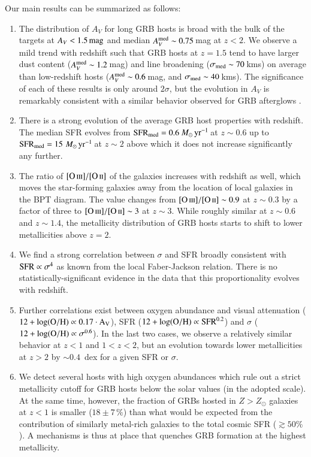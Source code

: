 \documentclass[traditabstract, longauth]{aa}
\newcommand{\oh}{12+\log(\rm{O/H})}
\newcommand{\oii}{[\ion{O}{ii}]}
\newcommand{\oiii}{[\ion{O}{iii}]}
\newcommand{\Msunyr}{$M_\odot\,\rm{yr}^{-1}$}
\begin{document}
Our main results can be summarized as follows:
\begin{enumerate}
\item The distribution of $A_V$ for long GRB hosts is broad with the bulk of the targets at $A_V<1.5\,\rm{mag}$ and median $A_V^{\rm med} \sim 0.75$\,mag at $z<2$. We observe a mild trend with redshift such that GRB hosts at $z = 1.5$ tend to have larger dust content ($A_V^{\rm med} \sim 1.2$\,mag) and line broadening ($\sigma_{\rm{med}}\sim70$\,kms) on average than low-redshift hosts ($A_V^{\rm med} \sim 0.6$\,mag, and $\sigma_{\rm{med}}\sim40$\,kms). The significance of each of these results is only around $2\sigma$, but the evolution in $A_V$ is remarkably consistent with a similar behavior observed for GRB afterglows \citep{2013MNRAS.432.1231C}.
\item There is a strong evolution of the average GRB host properties with redshift. The median SFR evolves from $\rm{SFR_{med}} = 0.6$\,\Msunyr\,at $z\sim0.6$ up to $\rm{SFR_{med}} = 15$\,\Msunyr\,at $z\sim2$ above which it does not increase significantly any further. 
\item The ratio of $\oiii/\oii$ of the galaxies increases with redshift as well, which moves the star-forming galaxies away from the location of local galaxies in the BPT diagram. The value changes from  $\oiii/\oii\sim0.9$ at $z\sim0.3$ by a factor of three to $\oiii/\oii\sim3$ at $z\sim3$. While roughly similar at $z\sim0.6$ and $z\sim1.4$, the metallicity distribution of GRB hosts starts to shift to lower metallicities above $z=2$.
\item We find a strong correlation between $\sigma$ and SFR broadly consistent with $\rm{SFR}\propto\sigma^4$ as known from the local Faber-Jackson relation. There is no statistically-significant evidence in the data that this proportionality evolves with redshift. 
\item Further correlations exist between oxygen abundance and visual attenuation ($\oh \propto 0.17\cdot A_V$), SFR  ($\oh \propto\mathrm{SFR}^{0.2}$) and $\sigma$ ($\oh \propto\sigma^{0.6}$). In the last two cases, we observe a relatively similar behavior at $z < 1$ and $1<z<2$, but an evolution towards lower metallicities at $z > 2$ by $\sim 0.4$~dex for a given SFR or $\sigma$.

\item We detect several hosts with high oxygen abundances which rule out a strict metallicity cutoff for GRB hosts below the solar values (in the adopted scale). At the same time, however, the fraction of GRBs hosted in $Z>Z_{\odot}$ galaxies at $z<1$ is smaller ($18\pm7\,\%$) than what would be expected from the contribution of similarly metal-rich galaxies to the total cosmic SFR ($\gtrsim 50\%$). A mechanisms is thus at place that quenches GRB formation at the highest metallicity. 
\end{enumerate}
\end{document}

